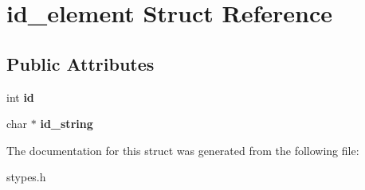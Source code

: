 \hypertarget{structid__element}{
\section{id\_\-element Struct Reference}
\label{structid__element}
}
\subsection*{Public Attributes}
\begin{DoxyCompactItemize}
\item 
\hypertarget{structid__element_a05f6fa143d9737875b46857e20fad99c}{
int {\bfseries id}}
\label{structid__element_a05f6fa143d9737875b46857e20fad99c}

\item 
\hypertarget{structid__element_a7bc9456f4d0a0ad95d6c63f12f97dda0}{
char $\ast$ {\bfseries id\_\-string}}
\label{structid__element_a7bc9456f4d0a0ad95d6c63f12f97dda0}

\end{DoxyCompactItemize}


The documentation for this struct was generated from the following file:\begin{DoxyCompactItemize}
\item 
stypes.h\end{DoxyCompactItemize}
